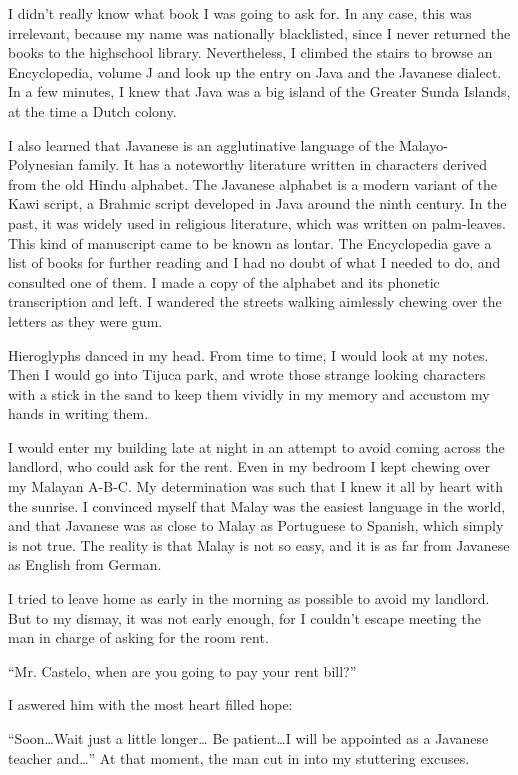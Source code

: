 \documentclass[a4paper,12pt]{book}
\begin{document}
I didn't really know what
book I was going to ask for.
In any case, this was irrelevant,
because my name was nationally blacklisted,
since I never returned the books to
the highschool library. Nevertheless,
I climbed the stairs to browse
an Encyclopedia,
volume J and look up the entry on
Java and the Javanese dialect. 
In a few minutes, I knew that Java was a
big island of the Greater Sunda Islands,
at the time a Dutch colony.

I also learned that Javanese is an agglutinative
language of the Malayo-Polynesian family.
It has a noteworthy literature written in
characters derived from the old Hindu alphabet.
The Javanese alphabet is a modern variant
of the Kawi script, a Brahmic script developed
in Java around the ninth century.
In the past, it was widely used in religious literature,
which was written on palm-leaves.
This kind of manuscript came to be known
as  lontar.
The Encyclopedia gave a list of books for further
reading and I had no doubt of what I needed
to do, and consulted one of them.
I made a copy of the alphabet and its phonetic
transcription and left. I wandered the streets
walking aimlessly chewing over the letters as
they were gum.

Hieroglyphs danced in my head. From time to time,
I would look at my notes. Then I would
go into Tijuca park, and wrote
those strange looking characters
with a stick in the sand to keep
them vividly in my memory
and accustom my hands in writing them.

I would enter my building late at night in
an attempt to avoid coming across the
landlord, who could ask for the rent.
Even in my bedroom I kept chewing over
my Malayan A-B-C. My determination was such
that I knew it all by heart with the sunrise.
I convinced myself that Malay was the
easiest language in the world, and that Javanese
was as close to Malay as Portuguese to
Spanish, which simply is not true.
The reality is that Malay is not so
easy, and it is  as
far from Javanese as English from German.

I tried to leave home as early in the morning
as possible to avoid my landlord.
But to my dismay, it was not early enough,
for I couldn't escape meeting the man
in charge of asking for the room rent.

``Mr. Castelo, when are you going to
pay your rent bill?''

I aswered him with the most heart filled hope:

``Soon\ldots Wait just a little longer\ldots
Be patient\ldots I will be appointed as a
Javanese teacher and\ldots''
At that moment, the man cut in into my stuttering
excuses.
\end{document}
